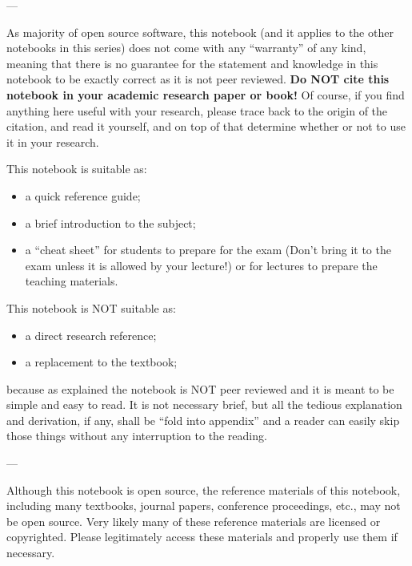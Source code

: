 \noindent ---

\noindent As majority of open source software, this notebook (and it applies to the other notebooks in this series) does not come with any ``warranty'' of any kind, meaning that there is no guarantee for the statement and knowledge in this notebook to be exactly correct as it is not peer reviewed. \textbf{Do NOT cite this notebook in your academic research paper or book!} Of course, if you find anything here useful with your research, please trace back to the origin of the citation, and read it yourself, and on top of that determine whether or not to use it in your research.

This notebook is suitable as:
\begin{itemize}
  \item a quick reference guide;
  \item a brief introduction to the subject;
  \item a ``cheat sheet'' for students to prepare for the exam (Don't bring it to the exam unless it is allowed by your lecture!) or for lectures to prepare the teaching materials.
\end{itemize}

This notebook is NOT suitable as:
\begin{itemize}
  \item a direct research reference;
  \item a replacement to the textbook;
\end{itemize}
because as explained the notebook is NOT peer reviewed and it is meant to be simple and easy to read. It is not necessary brief, but all the tedious explanation and derivation, if any, shall be ``fold into appendix'' and a reader can easily skip those things without any interruption to the reading.

\noindent ---

\noindent Although this notebook is open source, the reference materials of this notebook, including many textbooks, journal papers, conference proceedings, etc., may not be open source. Very likely many of these reference materials are licensed or copyrighted. Please legitimately access these materials and properly use them if necessary. \vadjust{\vfill\pagebreak}
